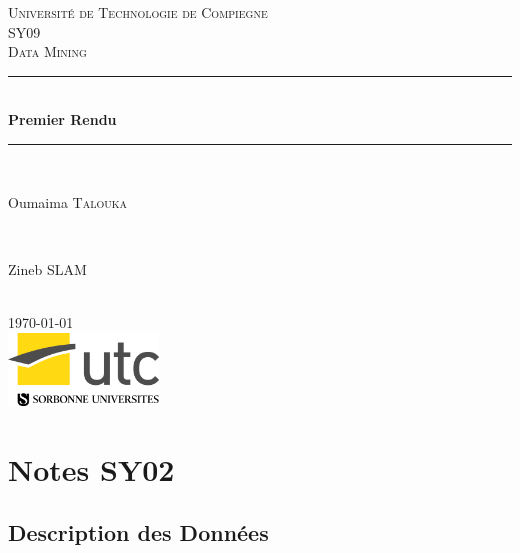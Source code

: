 \documentclass[]{report}
\begin{document}
	
\begin{titlepage}
	
	\newcommand{\HRule}{\rule{\linewidth}{0.5mm}} 
	
	\center 
	
	\textsc{\LARGE Université de Technologie de Compiegne}\\[1.5cm]
	\textsc{\Large SY09}\\[0.5cm] 
	\textsc{\large Data Mining}\\[0.5cm]
		
	\HRule \\[0.4cm]
	{ \huge \bfseries Premier Rendu}\\[0.4cm] 
	\HRule \\[1.5cm]
		
	\begin{minipage}{0.4\textwidth}
		\begin{flushleft} \large
			Oumaima \textsc{Talouka} 
		\end{flushleft}
	\end{minipage}
	~
	\begin{minipage}{0.4\textwidth}
		\begin{flushright} \large
			Zineb \textsc{SLAM} 
		\end{flushright}
	\end{minipage}\\[2cm]

	{\large \today}\\[2cm] 

	\includegraphics[width=40mm]{Figures/utc.jpg}\\ %

	\vfill
	
\end{titlepage}



\begin{abstract}


\end{abstract}

\tableofcontents

\chapter{Notes SY02}

\section{Description des Données}
\end{document}
